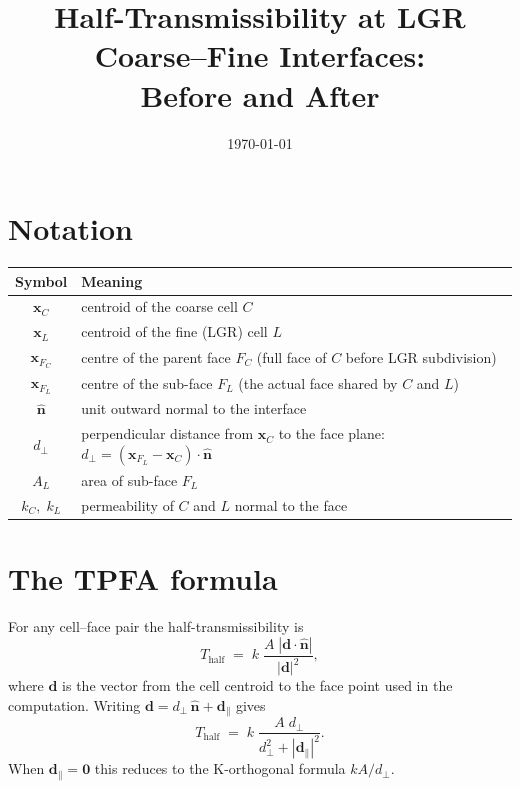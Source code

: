 \documentclass[11pt,a4paper]{article}
\title{Half-Transmissibility at LGR Coarse--Fine Interfaces:\\Before and After}
\author{}
\date{\today}
\begin{document}
\maketitle

\section*{Notation}

\begin{center}
\begin{tabular}{cl}
\toprule
Symbol & Meaning \\
\midrule
$\mathbf{x}_C$      & centroid of the coarse cell $C$ \\
$\mathbf{x}_L$      & centroid of the fine (LGR) cell $L$ \\
$\mathbf{x}_{F_C}$  & centre of the parent face $F_C$
                       (full face of $C$ before LGR subdivision) \\
$\mathbf{x}_{F_L}$  & centre of the sub-face $F_L$
                       (the actual face shared by $C$ and $L$) \\
$\hat{\mathbf{n}}$  & unit outward normal to the interface \\
$d_\perp$           & perpendicular distance from $\mathbf{x}_C$
                       to the face plane:
                       $d_\perp = (\mathbf{x}_{F_L}-\mathbf{x}_C)
                       \cdot\hat{\mathbf{n}}$ \\
$A_L$               & area of sub-face $F_L$ \\
$k_C,\;k_L$         & permeability of $C$ and $L$ normal to the face \\
\bottomrule
\end{tabular}
\end{center}

\bigskip

\section*{The TPFA formula}

For any cell--face pair the half-transmissibility is
\begin{equation}
  T_\mathrm{half} \;=\; k\;\frac{A\;|\mathbf{d}\cdot\hat{\mathbf{n}}|}
                                 {|\mathbf{d}|^{2}},
\end{equation}
where $\mathbf{d}$ is the vector from the cell centroid to the face
point used in the computation.  Writing $\mathbf{d} =
d_\perp\,\hat{\mathbf{n}} + \mathbf{d}_\parallel$ gives
\begin{equation}
  T_\mathrm{half} \;=\; k\;\frac{A\;d_\perp}
                                 {d_\perp^2 + |\mathbf{d}_\parallel|^2}.
\end{equation}
When $\mathbf{d}_\parallel = \mathbf{0}$ this reduces to the
K-orthogonal formula $k A / d_\perp$.
\end{document}
